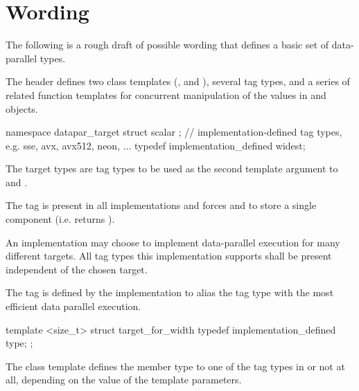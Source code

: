 \section{Wording}

The following is a rough draft of possible wording that defines a basic set of data-parallel types.

\begin{wgText}

  

  \pnum
  The header  defines two class templates (\datapar, and \mask), several tag types, and a series of related function templates for concurrent manipulation of the values in \datapar and \mask objects.

  \begin{itemdecl}
    namespace datapar_target {
      struct scalar {};
      // implementation-defined tag types, e.g. sse, avx, avx512, neon, ...
      typedef implementation_defined widest;
    }
  \end{itemdecl}
  \begin{itemdescr}
    \pnum
    The target types are tag types to be used as the second template argument to \datapar and \mask.

    \pnum
    The  tag is present in all implementations and forces \datapar and \mask to store a single component (i.e. \datapar{} returns ).

    \pnum
    An implementation may choose to implement data-parallel execution for many different targets.
    All tag types this implementation supports shall be present independent of the chosen target.

    \pnum
    The  tag is defined by the implementation to alias the tag type with the most efficient data parallel execution.
  \end{itemdescr}

  \begin{itemdecl}
    template <size_t> struct target_for_width {
      typedef implementation_defined type;
    };
  \end{itemdecl}
  \begin{itemdescr}
    \pnum
    The  class template defines the member type  to one of the tag types in  or not at all, depending on the value of the template parameters.


\end{itemdescr}
\end{wgText}
